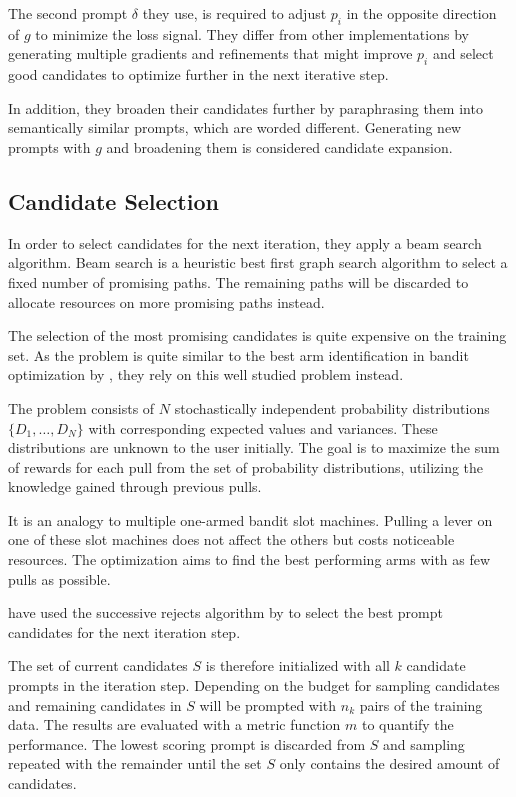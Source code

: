 The second prompt $\delta$ they use, is required to adjust $p_i$ in the opposite direction of $g$ to minimize the loss signal. They differ from other implementations by generating multiple gradients and refinements that might improve $p_i$ and select good candidates to optimize further in the next iterative step.

In addition, they broaden their candidates further by paraphrasing them into semantically similar prompts, which are worded different. Generating new prompts with $g$ and broadening them is considered candidate expansion.

\subsection{Candidate Selection}
In order to select candidates for the next iteration, they apply a beam search algorithm. Beam search is a heuristic best first graph search algorithm to select a fixed number of promising paths. The remaining paths will be discarded to allocate resources on more promising paths instead. \cite{BeamSearch}

The selection of the most promising candidates is quite expensive on the training set. As the problem is quite similar to the best arm identification in bandit optimization by , they rely on this well studied problem instead.

The problem consists of $N$ stochastically independent probability distributions $\{ D_1, \dots, D_N\}$ with corresponding expected values and variances. These distributions are unknown to the user initially. The goal is to maximize the sum of rewards for each pull from the set of probability distributions, utilizing the knowledge gained through previous pulls. \cite{kuleshov2014AlgorithmsMultiarmeda}

It is an analogy to multiple one-armed bandit slot machines. Pulling a lever on one of these slot machines does not affect the others but costs noticeable resources. The optimization aims to find the best performing arms with as few pulls as possible. 

\citeauthor{pryzant2023AutomaticPrompt} have used the successive rejects algorithm by  to select the best prompt candidates for the next iteration step.

The set of current candidates $S$ is therefore initialized with all $k$ candidate prompts in the iteration step. Depending on the budget for sampling candidates and remaining candidates in $S$ will be prompted with $n_k$ pairs of the training data. The results are evaluated with a metric function $m$ to quantify the performance. The lowest scoring prompt is discarded from $S$ and sampling repeated with the remainder until the set $S$ only contains the desired amount of candidates.

